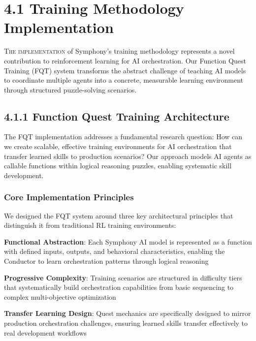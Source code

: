 
\section{4.1 Training Methodology Implementation}
\label{sec:training-methodology-impl}

\vspace{0.3cm}
\lettrine{T}{he implementation} of Symphony's training methodology represents a novel contribution to reinforcement learning for AI orchestration. Our Function Quest Training (FQT) system transforms the abstract challenge of teaching AI models to coordinate multiple agents into a concrete, measurable learning environment through structured puzzle-solving scenarios.

\subsection*{4.1.1 Function Quest Training Architecture}

The FQT implementation addresses a fundamental research question: How can we create scalable, effective training environments for AI orchestration that transfer learned skills to production scenarios? Our approach models AI agents as callable functions within logical reasoning puzzles, enabling systematic skill development.

\subsubsection*{Core Implementation Principles}

We designed the FQT system around three key architectural principles that distinguish it from traditional RL training environments:

\begin{expandedlist}
    \item \textbf{Functional Abstraction}: Each Symphony AI model is represented as a function with defined inputs, outputs, and behavioral characteristics, enabling the Conductor to learn orchestration patterns through logical reasoning
    \item \textbf{Progressive Complexity}: Training scenarios are structured in difficulty tiers that systematically build orchestration capabilities from basic sequencing to complex multi-objective optimization
    \item \textbf{Transfer Learning Design}: Quest mechanics are specifically designed to mirror production orchestration challenges, ensuring learned skills transfer effectively to real development workflows
\end{expandedlist}

